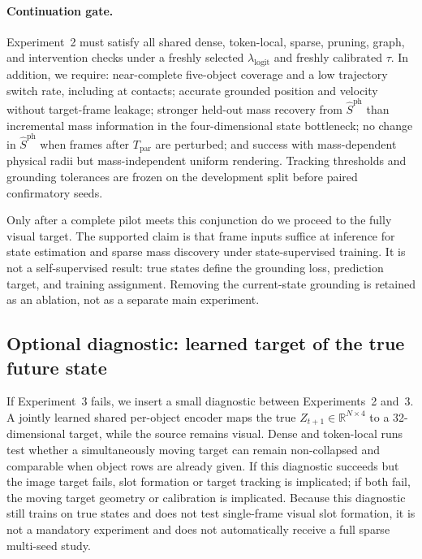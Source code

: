\paragraph{Continuation gate.}
Experiment~2 must satisfy all shared dense, token-local, sparse, pruning, graph, and intervention
checks under a freshly selected $\lambda_{\mathrm{logit}}$ and freshly calibrated $\tau$.  In
addition, we require: near-complete five-object coverage and a low trajectory switch rate,
including at contacts; accurate grounded position and velocity without target-frame leakage;
stronger held-out mass recovery from $\widehat S^{\mathrm{ph}}$ than incremental mass information
in the four-dimensional state bottleneck; no change in $\widehat S^{\mathrm{ph}}$ when frames after
$T_{\mathrm{par}}$ are perturbed; and success with mass-dependent physical radii but
mass-independent uniform rendering.  Tracking thresholds and grounding tolerances are frozen on
the development split before paired confirmatory seeds.

Only after a complete pilot meets this conjunction do we proceed to the fully visual target.
The supported claim is that frame inputs suffice at inference for state estimation and sparse mass
discovery under state-supervised training.  It is not a self-supervised result: true states define
the grounding loss, prediction target, and training assignment.  Removing the current-state
grounding is retained as an ablation, not as a separate main experiment.

\subsection{Optional diagnostic: learned target of the true future state}
\label{sec:experiments:state-target-diagnostic}

If Experiment~3 fails, we insert a small diagnostic between Experiments~2 and~3.  A jointly
learned shared per-object encoder maps the true $Z_{t+1}\in\mathbb{R}^{N\times4}$ to a
32-dimensional target, while the source remains visual.  Dense and token-local runs test whether
a simultaneously moving target can remain non-collapsed and comparable when object rows are
already given.  If this diagnostic succeeds but the image target fails, slot formation or target
tracking is implicated; if both fail, the moving target geometry or calibration is implicated.
Because this diagnostic still trains on true states and does not test single-frame visual slot
formation, it is not a mandatory experiment and does not automatically receive a full sparse
multi-seed study.

